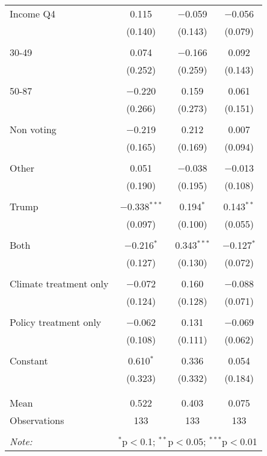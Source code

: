 \begin{tabular}{@{\extracolsep{5pt}}lccc}
 Income Q4 & 0.115 & $-$0.059 & $-$0.056 \\ 
  & (0.140) & (0.143) & (0.079) \\ 
  & & & \\ 
 30-49 & 0.074 & $-$0.166 & 0.092 \\ 
  & (0.252) & (0.259) & (0.143) \\ 
  & & & \\ 
 50-87 & $-$0.220 & 0.159 & 0.061 \\ 
  & (0.266) & (0.273) & (0.151) \\ 
  & & & \\ 
 Non voting & $-$0.219 & 0.212 & 0.007 \\ 
  & (0.165) & (0.169) & (0.094) \\ 
  & & & \\ 
 Other & 0.051 & $-$0.038 & $-$0.013 \\ 
  & (0.190) & (0.195) & (0.108) \\ 
  & & & \\ 
 Trump & $-$0.338$^{***}$ & 0.194$^{*}$ & 0.143$^{**}$ \\ 
  & (0.097) & (0.100) & (0.055) \\ 
  & & & \\ 
 Both & $-$0.216$^{*}$ & 0.343$^{***}$ & $-$0.127$^{*}$ \\ 
  & (0.127) & (0.130) & (0.072) \\ 
  & & & \\ 
 Climate treatment only & $-$0.072 & 0.160 & $-$0.088 \\ 
  & (0.124) & (0.128) & (0.071) \\ 
  & & & \\ 
 Policy treatment only & $-$0.062 & 0.131 & $-$0.069 \\ 
  & (0.108) & (0.111) & (0.062) \\ 
  & & & \\ 
 Constant & 0.610$^{*}$ & 0.336 & 0.054 \\ 
  & (0.323) & (0.332) & (0.184) \\ 
  & & & \\ 
\hline \\[-1.8ex] 
Mean & 0.522 & 0.403 & 0.075 \\ 
Observations & 133 & 133 & 133 \\ 
\hline 
\hline \\[-1.8ex] 
\textit{Note:}  & \multicolumn{3}{r}{$^{*}$p$<$0.1; $^{**}$p$<$0.05; $^{***}$p$<$0.01} \\ 
\end{tabular} 

